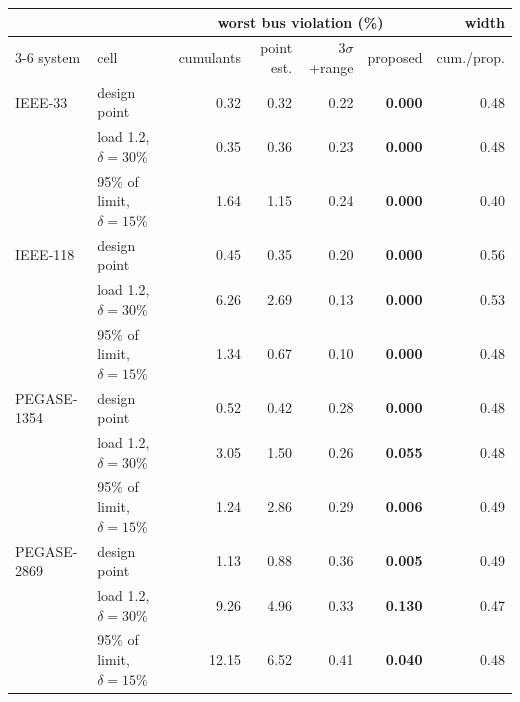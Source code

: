 \begin{tabular}{llrrrrr}
\toprule
 & & \multicolumn{4}{c}{worst bus violation (\%)} & width \\ \cmidrule(lr){3-6}
system & cell & cumulants & point est. & $3\sigma$+range & proposed & cum./prop. \\
\midrule
IEEE-33 & design point & 0.32 & 0.32 & 0.22 & \textbf{0.000} & 0.48 \\
 & load 1.2, $\delta = 30\%$ & 0.35 & 0.36 & 0.23 & \textbf{0.000} & 0.48 \\
 & 95\% of limit, $\delta = 15\%$ & 1.64 & 1.15 & 0.24 & \textbf{0.000} & 0.40 \\
\addlinespace
IEEE-118 & design point & 0.45 & 0.35 & 0.20 & \textbf{0.000} & 0.56 \\
 & load 1.2, $\delta = 30\%$ & 6.26 & 2.69 & 0.13 & \textbf{0.000} & 0.53 \\
 & 95\% of limit, $\delta = 15\%$ & 1.34 & 0.67 & 0.10 & \textbf{0.000} & 0.48 \\
\addlinespace
PEGASE-1354 & design point & 0.52 & 0.42 & 0.28 & \textbf{0.000} & 0.48 \\
 & load 1.2, $\delta = 30\%$ & 3.05 & 1.50 & 0.26 & \textbf{0.055} & 0.48 \\
 & 95\% of limit, $\delta = 15\%$ & 1.24 & 2.86 & 0.29 & \textbf{0.006} & 0.49 \\
\addlinespace
PEGASE-2869 & design point & 1.13 & 0.88 & 0.36 & \textbf{0.005} & 0.49 \\
 & load 1.2, $\delta = 30\%$ & 9.26 & 4.96 & 0.33 & \textbf{0.130} & 0.47 \\
 & 95\% of limit, $\delta = 15\%$ & 12.15 & 6.52 & 0.41 & \textbf{0.040} & 0.48 \\
\bottomrule
\end{tabular}
